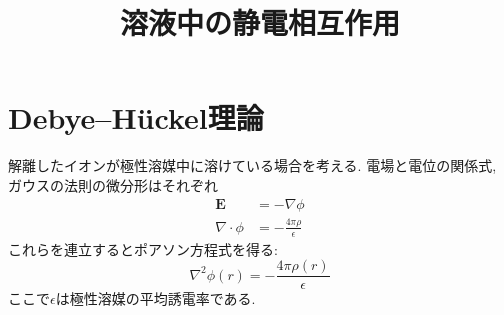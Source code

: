 





\title{溶液中の静電相互作用}
\maketitle

\section{Debye--H\"{u}ckel理論}
解離したイオンが極性溶媒中に溶けている場合を考える.
電場と電位の関係式, ガウスの法則の微分形はそれぞれ
\begin{align}
    \bm{E} &= - \nabla \phi
    \\
    \nabla \cdot \phi &= - \frac{4\pi\rho}{\epsilon}
\end{align}
これらを連立するとポアソン方程式を得る:
\begin{equation}
    \nabla^{2} \phi(r) = - \frac{4\pi\rho(r)}{\epsilon}
    \label{Eq:Poisson-Equation}
\end{equation}
ここで$\epsilon$は極性溶媒の平均誘電率である.

